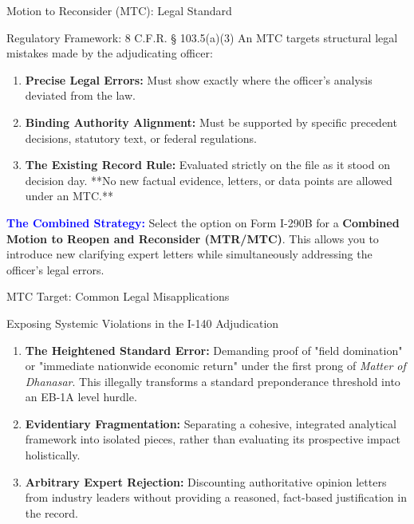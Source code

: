 \documentclass[11pt]{beamer}
\begin{document}
	
	\begin{frame}{Motion to Reconsider (MTC): Legal Standard}
		\scriptsize
		\begin{block}{Regulatory Framework: 8 C.F.R. § 103.5(a)(3)}
			An MTC targets structural legal mistakes made by the adjudicating officer:
			\begin{enumerate}
				\item \textbf{Precise Legal Errors:} Must show exactly where the officer's analysis deviated from the law.
				\item \textbf{Binding Authority Alignment:} Must be supported by specific precedent decisions, statutory text, or federal regulations.
				\item \textbf{The Existing Record Rule:} Evaluated strictly on the file as it stood on decision day. **No new factual evidence, letters, or data points are allowed under an MTC.**
			\end{enumerate}
			\vspace{0.15cm}
			\textcolor{blue}{\textbf{The Combined Strategy:}} Select the option on Form I-290B for a \textbf{Combined Motion to Reopen and Reconsider (MTR/MTC)}. This allows you to introduce new clarifying expert letters while simultaneously addressing the officer's legal errors.
		\end{block}
	\end{frame}
	
	\begin{frame}{MTC Target: Common Legal Misapplications}
		\scriptsize
		\begin{block}{Exposing Systemic Violations in the I-140 Adjudication}
			\begin{enumerate}
				\item \textbf{The Heightened Standard Error:} Demanding proof of "field domination" or "immediate nationwide economic return" under the first prong of \textit{Matter of Dhanasar}. This illegally transforms a standard preponderance threshold into an EB-1A level hurdle.
				\item \textbf{Evidentiary Fragmentation:} Separating a cohesive, integrated analytical framework into isolated pieces, rather than evaluating its prospective impact holistically.
				\item \textbf{Arbitrary Expert Rejection:} Discounting authoritative opinion letters from industry leaders without providing a reasoned, fact-based justification in the record.
			\end{enumerate}
		\end{block}
	\end{frame}
	
\end{document}
